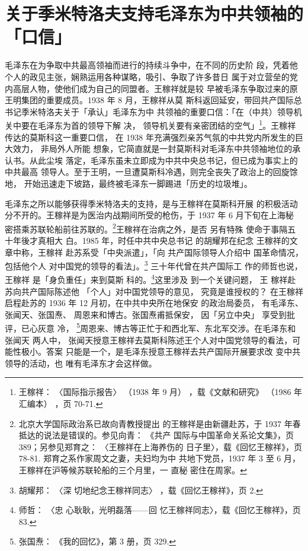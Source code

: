 \section{关于季米特洛夫支持毛泽东为中共领袖的「口信」}

毛泽东在为争取中共最高领袖而进行的持续斗争中，在不同的历史阶
段，凭着他个人的政见主张，娴熟运用各种谋略，吸引、争取了许多昔日
属于对立营垒的党内高层人物，使他们成为自己的同盟者。王稼祥就是较
早被毛泽东争取过来的原王明集团的重要成员。1938 年 8 月，王稼祥从莫
斯科返回延安，带回共产国际总书记季米特洛夫关于「承认」毛泽东为中
共领袖的重要口信：「在（中共）领导机关中要在毛泽东为首的领导下解
决，
领导机关要有亲密团结的空气」\footnote{王稼祥：
〈国际指示报告〉
（1938 年 9 月）
，载《文献和研究》
（1986 年汇编本）
，页 70-71.}。王稼祥传达的莫斯科这一重要口信，
在 1938 年充满强烈亲苏气氛的中共党内所发生的巨大效力，
非局外人所能
想象，它简直就是一封莫斯科对毛泽东中共领袖地位的承认书。从此尘埃
落定，毛泽东虽未立即成为中共中央总书记，但已成为事实上的中共最高
领导人。至于王明，一旦遭莫斯科冷遇，则完全丧失了政治上的回旋馀地，
开始迅速走下坡路，最终被毛泽东一脚踢进「历史的垃圾堆」。

毛泽东之所以能够获得季米特洛夫的支持，是与王稼祥在莫斯科开展 的积极活动
分不开的。王稼祥是为医治内战期间所受的枪伤，于 1937 年 6 月下旬在上海秘
密搭乘苏联轮船前往苏联的。\footnote{北京大学国际政治系已故向青教授提出
的王稼祥是由新疆赴苏，于 1937 年春抵达的说法是错误的。参见向青： 《共产
国际与中国革命关系论文集》，页 389；另参见郑育之： 〈王稼祥在上海养伤的
日子里〉，载《回忆王稼祥》，页 78-81. 郑育之系作家周文之妻，夫妇均为中
共地下党员，1937 年 3 至 6 月，王稼祥在沪等候苏联轮船的三个月里，一 直秘
密住在周家。}王稼祥在治病之外，是否 另有特殊 使命于事隔五十年後才真相大
白。1985 年，时任中共中央总书记 的胡耀邦在纪念 王稼祥的文章中称，王稼祥
赴苏系受「中央派遣」，「向 共产国际领导人介绍中 国革命情况， 包括他个人
对中国党的领导的看法」。\footnote{胡耀邦： 〈深 切地纪念王稼祥同志〉
，载《回忆王稼祥》，页 2.} 三十年代曾在共产国际工 作的师哲也说，王稼祥
是「身负重任」来到莫斯 科的。\footnote{师哲： 〈忠 心耿耿，光明磊落——回
忆王稼祥同志〉，载《回忆王稼祥》，页 83.}这里涉及 到一个关键问题， 王
稼祥赴苏向共产国际陈述他 「个人」对中国党领导的意见， 究竟是谁授权的？
在王稼祥启程赴苏的 1936 年 12 月初，在中共中央所在地保安 的政治局委员，
有毛泽东、张闻天、张国焘、 周恩来和博古。张国焘甫抵保安， 因「另立中央」
享受到批评，已心灰意 冷， \footnote{张国焘： 《我的回忆》，第 3 册，页
329.}周恩来、博古等正忙于和西北军、东北军交涉。在毛泽东和 张闻天 两人中，
张闻天授意王稼祥去莫斯科陈述王个人对中国党领导的看法，可 能性极小。答案
只能是一个，是毛泽东授意王稼祥去共产国际开展要求改 变中共 领导的活动，也
唯有毛泽东才会这样做。
 
